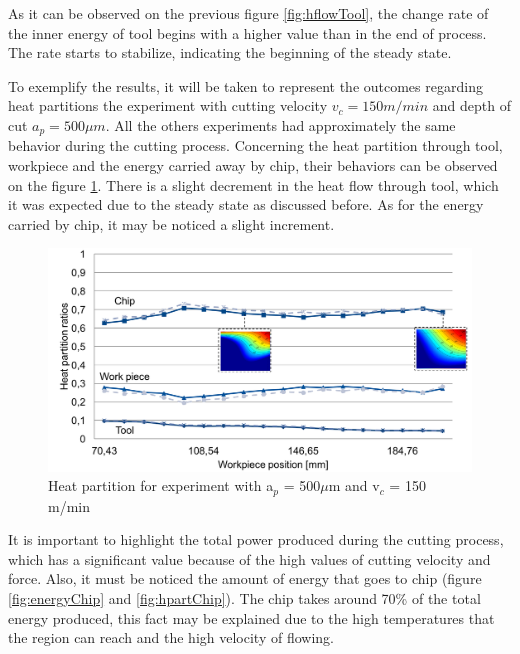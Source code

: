 		As it can be observed on the previous figure \ref{fig:hflowTool}, the change rate of the inner energy of tool begins with a higher value than in the end of process. The rate starts to stabilize, indicating the beginning of the steady state. 

		To exemplify the results, it will be taken to represent the outcomes regarding heat partitions the experiment with cutting velocity $v_{c} = 150 m/min$ and depth of cut $a_{p} = 500 \mu m$. All the others experiments had approximately the same behavior during the cutting process.
		Concerning the heat partition through tool, workpiece and the energy carried away by chip, their behaviors can be observed on the figure \ref{fig:hpartExp}. There is a slight decrement in the heat flow through tool, which it was expected due to the steady state as discussed before. As for the energy carried by chip, it may be noticed a slight increment.

		\begin{figure}[H]
			\centering
			\captionsetup{justification=centering}
			\includegraphics[scale=0.55]{Imagens/partition500150.png}
			\caption{Heat partition for experiment with a$_{p}$ = 500$\mu$m and v$_{c}$ = 150 m/min}
			\label{fig:hpartExp}
		\end{figure}

		It is important to highlight the total power produced during the cutting process, which has a significant value because of the high values of cutting velocity and force. Also, it must be noticed the amount of energy that goes to chip (figure \ref{fig:energyChip} and \ref{fig:hpartChip}). The chip takes around 70\% of the total energy produced, this fact may be explained due to the high temperatures that the region can reach and the high velocity of flowing.

